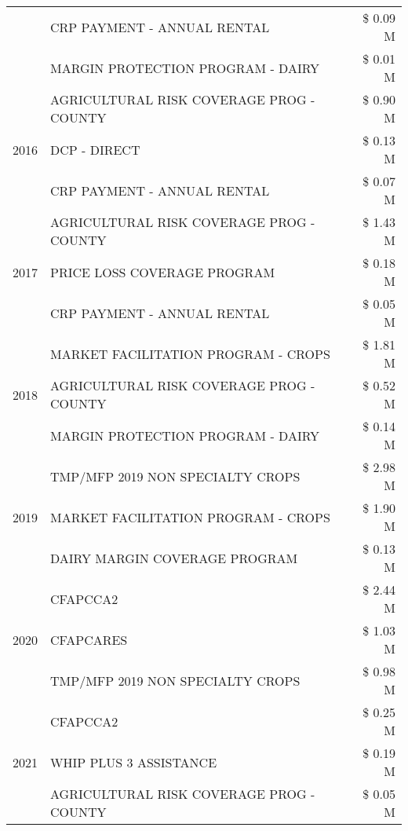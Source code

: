 \begin{tabular}{llr}
 & CRP PAYMENT - ANNUAL RENTAL & \$ 0.09 M \\
 & MARGIN PROTECTION PROGRAM - DAIRY & \$ 0.01 M \\
\cline{1-3}
\multirow[t]{3}{*}{2016} & AGRICULTURAL RISK COVERAGE PROG - COUNTY & \$ 0.90 M \\
 & DCP - DIRECT & \$ 0.13 M \\
 & CRP PAYMENT - ANNUAL RENTAL & \$ 0.07 M \\
\cline{1-3}
\multirow[t]{3}{*}{2017} & AGRICULTURAL RISK COVERAGE PROG - COUNTY & \$ 1.43 M \\
 & PRICE LOSS COVERAGE PROGRAM & \$ 0.18 M \\
 & CRP PAYMENT - ANNUAL RENTAL & \$ 0.05 M \\
\cline{1-3}
\multirow[t]{3}{*}{2018} & MARKET FACILITATION PROGRAM - CROPS & \$ 1.81 M \\
 & AGRICULTURAL RISK COVERAGE PROG - COUNTY & \$ 0.52 M \\
 & MARGIN PROTECTION PROGRAM - DAIRY & \$ 0.14 M \\
\cline{1-3}
\multirow[t]{3}{*}{2019} & TMP/MFP 2019 NON SPECIALTY CROPS & \$ 2.98 M \\
 & MARKET FACILITATION PROGRAM - CROPS & \$ 1.90 M \\
 & DAIRY MARGIN COVERAGE PROGRAM & \$ 0.13 M \\
\cline{1-3}
\multirow[t]{3}{*}{2020} & CFAPCCA2 & \$ 2.44 M \\
 & CFAPCARES & \$ 1.03 M \\
 & TMP/MFP 2019 NON SPECIALTY CROPS & \$ 0.98 M \\
\cline{1-3}
\multirow[t]{3}{*}{2021} & CFAPCCA2 & \$ 0.25 M \\
 & WHIP PLUS 3 ASSISTANCE & \$ 0.19 M \\
 & AGRICULTURAL RISK COVERAGE PROG - COUNTY & \$ 0.05 M \\
\cline{1-3}
\bottomrule
\end{tabular}
